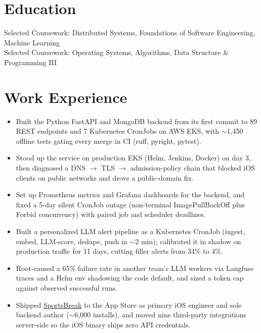 \documentclass[11pt, letterpaper]{article}
\begin{document}

\section{Education}
Selected Coursework: Distributed Systems, Foundations of Software Engineering, Machine Learning\\[1pt]
Selected Coursework: Operating Systems, Algorithms, Data Structure \& Programming III

\section{Work Experience}
\begin{itemize}
  \item Built the Python FastAPI and MongoDB backend from its first commit to 89 REST endpoints and 7 Kubernetes CronJobs on AWS EKS, with $\sim$1{,}450 offline tests gating every merge in CI (ruff, pyright, pytest).
  \item Stood up the service on production EKS (Helm, Jenkins, Docker) on day 3, then diagnosed a DNS $\to$ TLS $\to$ admission-policy chain that blocked iOS clients on public networks and drove a public-domain fix.
  \item Set up Prometheus metrics and Grafana dashboards for the backend, and fixed a 5-day silent CronJob outage (non-terminal ImagePullBackOff plus Forbid concurrency) with paired job and scheduler deadlines.
  \item Built a personalized LLM alert pipeline as a Kubernetes CronJob (ingest, embed, LLM-score, dedupe, push in $\sim$2 min); calibrated it in shadow on production traffic for 11 days, cutting filler alerts from 34\% to 4\%.
  \item Root-caused a 65\% failure rate in another team's LLM workers via Langfuse traces and a Helm env shadowing the code default, and sized a token cap against observed successful runs.
  \item Shipped \href{https://apps.apple.com/app/id6762649287}{SportsBreak} to the App Store as primary iOS engineer and sole backend author ($\sim$6{,}000 installs), and moved nine third-party integrations server-side so the iOS binary ships zero API credentials.
\end{itemize}
\end{document}
